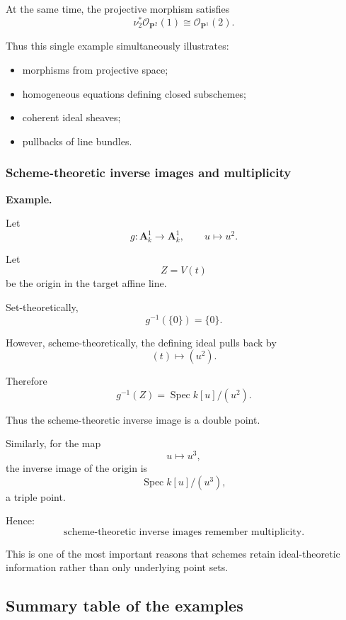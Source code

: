 \documentclass[12pt,a4paper]{article}
\theoremstyle{notespace}
\begin{document}
At the same time, the projective morphism satisfies
\[
\nu_2^*\mathcal O_{\mathbf P^2}(1)
\cong
\mathcal O_{\mathbf P^1}(2).
\]

Thus this single example simultaneously illustrates:

\begin{itemize}
	\item morphisms from projective space;
	\item homogeneous equations defining closed subschemes;
	\item coherent ideal sheaves;
	\item pullbacks of line bundles.
\end{itemize}

\subsubsection{Scheme-theoretic inverse images and multiplicity}

\textbf{Example.}

Let
\[
g:\mathbf A^1_k\longrightarrow\mathbf A^1_k,
\qquad
u\longmapsto u^2.
\]

Let
\[
Z=V(t)
\]
be the origin in the target affine line.

Set-theoretically,
\[
g^{-1}(\{0\})=\{0\}.
\]

However, scheme-theoretically, the defining ideal pulls back by
\[
(t)\longmapsto(u^2).
\]

Therefore
\[
g^{-1}(Z)
=
\operatorname{Spec}k[u]/(u^2).
\]

Thus the scheme-theoretic inverse image is a double point.

Similarly, for the map
\[
u\longmapsto u^3,
\]
the inverse image of the origin is
\[
\operatorname{Spec}k[u]/(u^3),
\]
a triple point.

Hence:
\[
\boxed{
	\text{scheme-theoretic inverse images remember multiplicity.}
}
\]

This is one of the most important reasons that schemes retain ideal-theoretic information rather than only underlying point sets.

\subsection{Summary table of the examples}
\end{document}
